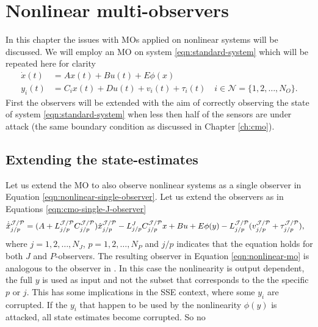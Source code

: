 \section{Nonlinear multi-observers}\label{ch:nonlinear-mos}
In this chapter the issues with MOs applied on nonlinear systems will be discussed. We will employ an MO on system \eqref{eqn:standard-system} which will be repeated here for clarity
\begin{equation*}
    \begin{split}
        \dot{x}(t) &= Ax(t) + Bu(t) + E\phi(x) \\
        y_i(t) &= C_ix(t) + Du(t) + v_i(t) + \tau_i(t) \quad i \in \mathcal{N} = \{1,2,\dots,N_O\}.
    \end{split}
\end{equation*}
First the observers will be extended with the aim of correctly observing the state of system \eqref{eqn:standard-system} when less then half of the sensors are under attack (the same boundary condition as discussed in Chapter \ref{ch:cmo}).

\subsection{Extending the state-estimates}
Let us extend the MO to also observe nonlinear systems as a single observer in Equation \eqref{eqn:nonlinear-single-observer}. Let us extend the observers as in Equations \eqref{eqn:cmo-single-J-observer}
\begin{equation}\label{eqn:nonlinear-mo}
    \begin{split}
        \dot{\hat{x}}_{j/p}^{\mathcal{J}/\mathcal{P}} &= (A + L_{j/p}^{\mathcal{J}/\mathcal{P}}C_{j/p}^{\mathcal{J}/\mathcal{P}})\hat{x}^{\mathcal{J}/\mathcal{P}}_{j/p} - L_{j/p}^JC_{j/p}^{\mathcal{J}/\mathcal{P}}x + Bu + E\phi(y) - L_{j/p}^{\mathcal{J}/\mathcal{P}}(v_{j/p}^{\mathcal{J}/\mathcal{P}} + \tau_{j/p}^{\mathcal{J}/\mathcal{P}}),
    \end{split}
\end{equation}
where $j=1,2,\dots,N_J$, $p=1,2,\dots,N_P$ and $j/p$ indicates that the equation holds for both $J$ and $P$-observers. The resulting observer in Equation \ref{eqn:nonlinear-mo} is analogous to the observer in \cite[Equation 5]{Chong2023MemoryAlgorithms}. In this case the nonlinearity is output dependent, the full $y$ is used as input and not the subset that corresponds to the the specific $p$ or $j$. This has some implications in the SSE context, where some $y_i$ are corrupted. If the $y_i$ that happen to be used by the nonlinearity $\phi(y)$ is attacked, all state estimates become corrupted. So no 

